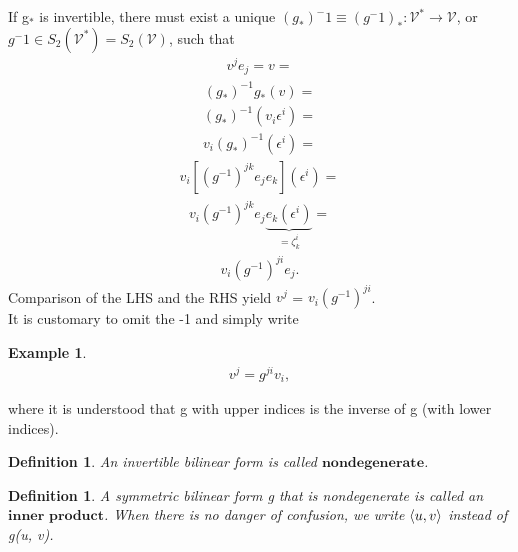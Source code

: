 \documentclass[12pt,a4paper]{article}
\newtheorem{defn}[thm]{Definition}
\newtheorem{exmp}{Example}[section]
\begin{document}
If g$_*$ is invertible, there must exist a unique $(g_*)^-1 \equiv (g^-1)_* : \mathcal{V}^* \to \mathcal{V}$, or $g^-1 \in S_2(\mathcal{V}^*)= S_2(\mathcal{V})$, such that
\begin{align*}
v^j e_j = v = 
\end{align*}
\begin{align*}
(g_*)^{-1} g_*(v)=
\end{align*}
\begin{align*}
(g_*)^{-1} (v_i \epsilon^i)=
\end{align*}
\begin{align*}
v_i (g_*)^{-1}(\epsilon^i)=
\end{align*}
\begin{align*}
v_i [ (g^{-1})^{jk} e_j e_k ]( \epsilon^i)=
\end{align*}
\begin{align*}
v_i (g^{-1}) ^ {jk} e_j \underbrace{e_k (\epsilon^i)}_{= \zeta^i_k}=
\end{align*}
\begin{align*}
v_i (g^{-1})^{ji} e_j.
\end{align*}
\indent Comparison of the LHS and the RHS yield $v^j$ = $v_i(g^{-1})^{ji}$. \\It is customary
to omit the -1 and simply write \\
\begin{exmp}\label{eq2}
\begin{align*} 
v^j = g ^ {ji} v_{i},
\end{align*}
\end{exmp}
where it is understood that g with upper indices is the inverse of g (with
lower indices). \\
\begin{defn}
An invertible bilinear form is called $\textbf{nondegenerate}$.
\end{defn}
\begin{defn}
A symmetric bilinear form g that is nondegenerate is called an $\textbf{inner product}$. When there is no danger of confusion, we write $\braket{u, v}$ instead of g(u, v).
\end{defn}
\end{document}
